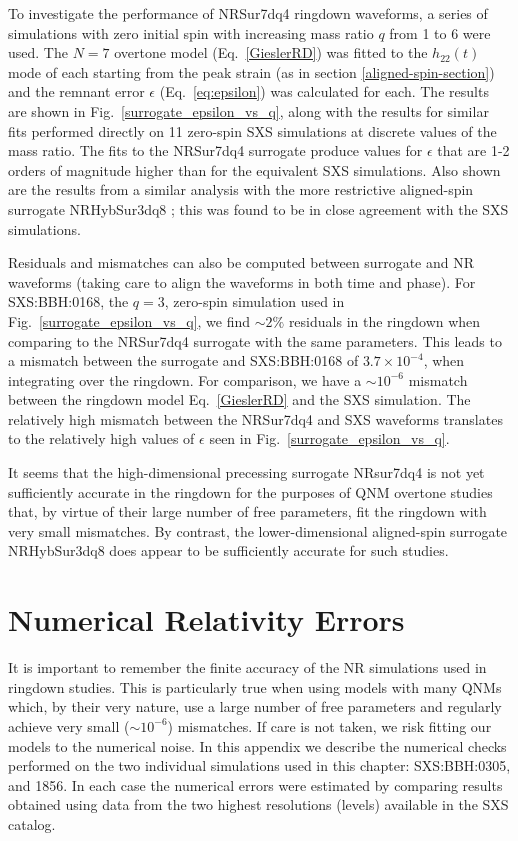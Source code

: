 To investigate the performance of NRSur7dq4 ringdown waveforms, a series of simulations with zero initial spin with increasing mass ratio $q$ from 1 to 6 were used. 
The $N=7$ overtone model (Eq.~\ref{GieslerRD}) was fitted to the $h_{22}(t)$ mode of each starting from the peak strain (as in section \ref{aligned-spin-section})
and the remnant error $\epsilon$ (Eq.~\ref{eq:epsilon}) was calculated for each.
The results are shown in Fig.~\ref{surrogate_epsilon_vs_q}, along with the results for similar fits performed directly on 11 zero-spin SXS simulations at discrete values of the mass ratio. 
The fits to the NRSur7dq4 surrogate produce values for $\epsilon$ that are 1-2 orders of magnitude higher than for the equivalent SXS simulations. 
Also shown are the results from a similar analysis with the more restrictive aligned-spin surrogate NRHybSur3dq8 \cite{Varma:2018mmi}; this was found to be in close agreement with the SXS simulations.

Residuals and mismatches can also be computed between surrogate and NR waveforms (taking care to align the waveforms in both time and phase).
For SXS:BBH:0168, the $q=3$, zero-spin simulation used in Fig.~\ref{surrogate_epsilon_vs_q}, we find $\sim 2\%$ residuals in the ringdown when comparing to the NRSur7dq4 surrogate with the same parameters. 
This leads to a mismatch between the surrogate and SXS:BBH:0168 of $3.7 \times 10^{-4}$, when integrating over the ringdown. For comparison, we have a $\sim 10^{-6}$ mismatch between the ringdown model Eq.~\eqref{GieslerRD} and the SXS simulation. The relatively high mismatch between the NRSur7dq4 and SXS waveforms translates to the relatively high values of $\epsilon$ seen in Fig.~\ref{surrogate_epsilon_vs_q}. 

It seems that the high-dimensional precessing surrogate NRsur7dq4 is not yet sufficiently accurate in the ringdown for the purposes of QNM overtone studies that, by virtue of their large number of free parameters, fit the ringdown with very small mismatches. 
By contrast, the lower-dimensional aligned-spin surrogate NRHybSur3dq8 does appear to be sufficiently accurate for such studies.


\section{Numerical Relativity Errors}\label{NR_error_appendix}

It is important to remember the finite accuracy of the NR simulations used in ringdown studies.
This is particularly true when using models with many QNMs which, by their very nature, use a large number of free parameters and regularly achieve very small ($\sim 10^{-6}$) mismatches.
If care is not taken, we risk fitting our models to the numerical noise. 
In this appendix we describe the numerical checks performed on the two individual simulations used in this chapter: SXS:BBH:0305, and 1856. %
In each case the numerical errors were estimated by comparing results obtained using data from the two highest resolutions (levels) available in the SXS catalog. 

